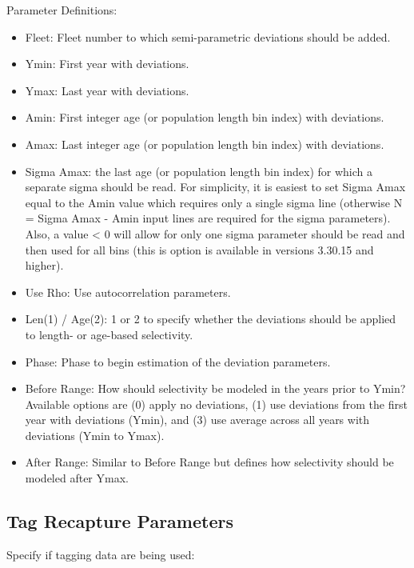 Parameter Definitions:
\begin{itemize}
	\item Fleet: Fleet number to which semi-parametric deviations should be added.
	\item Ymin: First year with deviations.
	\item Ymax: Last year with deviations.
	\item Amin: First integer age (or population length bin index) with deviations.
	\item Amax: Last integer age (or population length bin index) with deviations.
	\item Sigma Amax: the last age (or population length bin index) for which a separate sigma should be read. For simplicity, it is easiest to set Sigma Amax equal to the Amin value which requires only a single sigma line (otherwise N = Sigma Amax - Amin input lines are required for the sigma parameters). Also, a value < 0 will allow for only one sigma parameter should be read and then used for all bins (this is option is available in versions 3.30.15 and higher).
	\item Use Rho: Use autocorrelation parameters.
	\item Len(1) / Age(2): 1 or 2 to specify whether the deviations should be applied to length- or age-based selectivity.
	\item Phase: Phase to begin estimation of the deviation parameters.
	\item Before Range: How should selectivity be modeled in the years prior to Ymin? Available options are (0) apply no deviations, (1) use deviations from the first year with deviations (Ymin), and (3) use average across all years with deviations (Ymin to Ymax).
	\item After Range: Similar to Before Range but defines how selectivity should be modeled after Ymax.
\end{itemize}


\subsection{Tag Recapture Parameters}
Specify if tagging data are being used:


